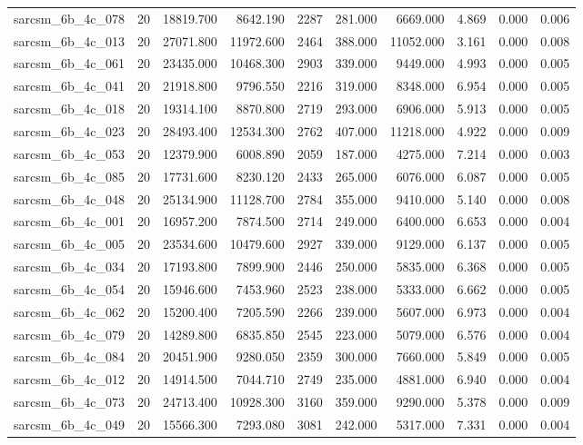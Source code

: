 \begin{tabular}{lrrrrrrrrr}
sarcsm\_6b\_4c\_078 & 20 & 18819.700 & 8642.190 & 2287 & 281.000 & 6669.000 & 4.869 & 0.000 & 0.006 \\
sarcsm\_6b\_4c\_013 & 20 & 27071.800 & 11972.600 & 2464 & 388.000 & 11052.000 & 3.161 & 0.000 & 0.008 \\
sarcsm\_6b\_4c\_061 & 20 & 23435.000 & 10468.300 & 2903 & 339.000 & 9449.000 & 4.993 & 0.000 & 0.005 \\
sarcsm\_6b\_4c\_041 & 20 & 21918.800 & 9796.550 & 2216 & 319.000 & 8348.000 & 6.954 & 0.000 & 0.005 \\
sarcsm\_6b\_4c\_018 & 20 & 19314.100 & 8870.800 & 2719 & 293.000 & 6906.000 & 5.913 & 0.000 & 0.005 \\
sarcsm\_6b\_4c\_023 & 20 & 28493.400 & 12534.300 & 2762 & 407.000 & 11218.000 & 4.922 & 0.000 & 0.009 \\
sarcsm\_6b\_4c\_053 & 20 & 12379.900 & 6008.890 & 2059 & 187.000 & 4275.000 & 7.214 & 0.000 & 0.003 \\
sarcsm\_6b\_4c\_085 & 20 & 17731.600 & 8230.120 & 2433 & 265.000 & 6076.000 & 6.087 & 0.000 & 0.005 \\
sarcsm\_6b\_4c\_048 & 20 & 25134.900 & 11128.700 & 2784 & 355.000 & 9410.000 & 5.140 & 0.000 & 0.008 \\
sarcsm\_6b\_4c\_001 & 20 & 16957.200 & 7874.500 & 2714 & 249.000 & 6400.000 & 6.653 & 0.000 & 0.004 \\
sarcsm\_6b\_4c\_005 & 20 & 23534.600 & 10479.600 & 2927 & 339.000 & 9129.000 & 6.137 & 0.000 & 0.005 \\
sarcsm\_6b\_4c\_034 & 20 & 17193.800 & 7899.900 & 2446 & 250.000 & 5835.000 & 6.368 & 0.000 & 0.005 \\
sarcsm\_6b\_4c\_054 & 20 & 15946.600 & 7453.960 & 2523 & 238.000 & 5333.000 & 6.662 & 0.000 & 0.005 \\
sarcsm\_6b\_4c\_062 & 20 & 15200.400 & 7205.590 & 2266 & 239.000 & 5607.000 & 6.973 & 0.000 & 0.004 \\
sarcsm\_6b\_4c\_079 & 20 & 14289.800 & 6835.850 & 2545 & 223.000 & 5079.000 & 6.576 & 0.000 & 0.004 \\
sarcsm\_6b\_4c\_084 & 20 & 20451.900 & 9280.050 & 2359 & 300.000 & 7660.000 & 5.849 & 0.000 & 0.005 \\
sarcsm\_6b\_4c\_012 & 20 & 14914.500 & 7044.710 & 2749 & 235.000 & 4881.000 & 6.940 & 0.000 & 0.004 \\
sarcsm\_6b\_4c\_073 & 20 & 24713.400 & 10928.300 & 3160 & 359.000 & 9290.000 & 5.378 & 0.000 & 0.009 \\
sarcsm\_6b\_4c\_049 & 20 & 15566.300 & 7293.080 & 3081 & 242.000 & 5317.000 & 7.331 & 0.000 & 0.004 \\

\end{tabular}
